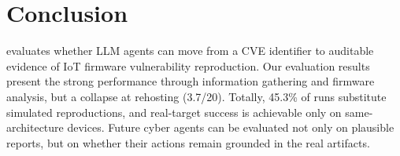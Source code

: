 \section{Conclusion}
\sys{} evaluates whether LLM agents can move from a CVE identifier to auditable evidence of IoT firmware vulnerability reproduction. Our evaluation results present the strong performance through information gathering and firmware analysis, but a collapse at rehosting (3.7/20). Totally, 45.3\% of runs substitute simulated reproductions, and real-target success is achievable only on same-architecture devices. Future cyber agents can be evaluated not only on plausible reports, but on whether their actions remain grounded in the real artifacts.
